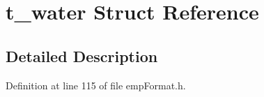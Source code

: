 \hypertarget{structt__water}{}\section{t\+\_\+water Struct Reference}
\label{structt__water}


\subsection{Detailed Description}


Definition at line 115 of file emp\+Format.\+h.

